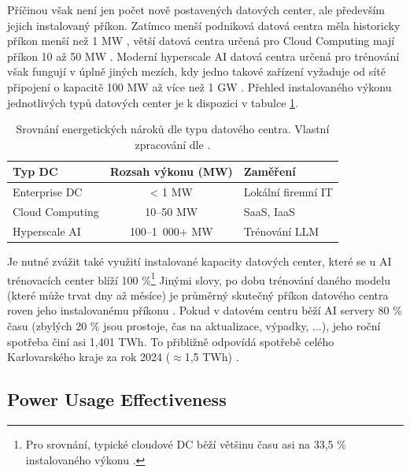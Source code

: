 Příčinou však není jen počet nově postavených datových center, ale především jejich instalovaný příkon. Zatímco menší podniková datová centra měla historicky příkon menší než 1 MW \cite[s. 79]{barroso_data_2026} \cite[s. 5]{sheng_power_2026}, větší datová centra určená pro Cloud Computing mají příkon 10 až 50 MW \cite[s. 38]{iea_energy_2025}. Moderní hyperscale AI datová centra určená pro trénování však fungují v úplně jiných mezích, kdy jedno takové zařízení vyžaduje od sítě připojení o kapacitě 100 MW až více než 1 GW \cite[s. 1]{chen_electricity_2025} \cite[s. 5]{sheng_power_2026}. Přehled instalovaného výkonu jednotlivých typů datových center je k dispozici v tabulce \ref{tab:energeticke_rozsahy}.

\begin{table}[t]
    \centering
    \begin{tabular}{|l|c|l|}
        \hline
        \textbf{Typ DC} & \textbf{Rozsah výkonu (MW)} & \textbf{Zaměření} \\ \hline
        Enterprise DC & < 1 MW & Lokální firemní IT \\ \hline
        Cloud Computing & 10--50 MW & SaaS, IaaS \\ \hline
        Hyperscale AI & 100--1~000+ MW & Trénování LLM \\ \hline
    \end{tabular}
    \caption{Srovnání energetických nároků dle typu datového centra. Vlastní zpracování dle \cite{barroso_data_2026, iea_energy_2025, chen_electricity_2025}.}
    \label{tab:energeticke_rozsahy}
\end{table}

Je nutné zvážit také využití instalované kapacity datových center, které se u AI trénovacích center blíží 100 \%\footnote{Pro srovnání, typické cloudové DC běží většinu času asi na 33,5 \% instalovaného výkonu \cite[s. 224]{barroso_data_2026}.} Jinými slovy, po dobu trénování daného modelu (které může trvat dny až měsíce) je průměrný skutečný příkon datového centra roven jeho instalovanému příkonu \cite[s. 3]{avelar_ai_2023}. Pokud v datovém centru běží AI servery 80 \% času \cite[s. 27]{LBNL-2001637} (zbylých 20 \% jsou prostoje, čas na aktualizace, výpadky, ...), jeho roční spotřeba činí asi 1,401 TWh. To přibližně odpovídá spotřebě celého Karlovarského kraje za rok 2024 ($\approx$1,5 TWh) \cite{energeticky_regulacni_urad_spotreba_2024}.

\subsection{Power Usage Effectiveness}

